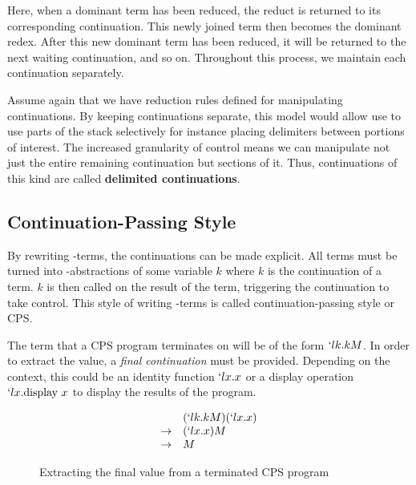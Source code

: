   Here, when a dominant term has been reduced, the reduct is returned
  to its corresponding continuation. This newly joined term then
  becomes the dominant redex. After this new dominant term has been
  reduced, it will be returned to the next waiting continuation, and
  so on. Throughout this process, we maintain each continuation
  separately.
  
  Assume again that we have reduction rules defined for manipulating
  continuations. By keeping continuations separate, this model would 
  allow use to use parts of the stack selectively for instance placing
  delimiters between portions of interest. The increased granularity of 
  control means we can manipulate not just the entire remaining continuation 
  but sections of it. Thus, continuations of this kind are called 
  \textbf{delimited continuations}.

  \subsection{Continuation-Passing Style}
 
  By rewriting \lam-terms, the continuations can be made explicit. All
  terms must be turned into \lam-abstractions of some variable $k$
  where $k$ is the continuation of a term. $k$ is then called on the
  result of the term, triggering the continuation to take control.
  This style of writing \lam-terms is called continuation-passing
  style or CPS.
  
  
  The term that a CPS program terminates on will be of the form
  $`lk.kM$. In order to extract the value, a \emph{final continuation}
  must be provided. Depending on the context, this could be an identity 
  function $`lx.x$ or a display operation $`lx.\text{display }x$ to
  display the results of the program.

  \begin{figure}[!h]
  \caption{Extracting the final value from a terminated CPS program}
  \[
  \begin{array}{ll}
                & (`lk.kM)(`lx.x) \\
    \rightarrow & (`lx.x)M \\
    \rightarrow & M
  \end{array}
  \]
  \end{figure}
 

